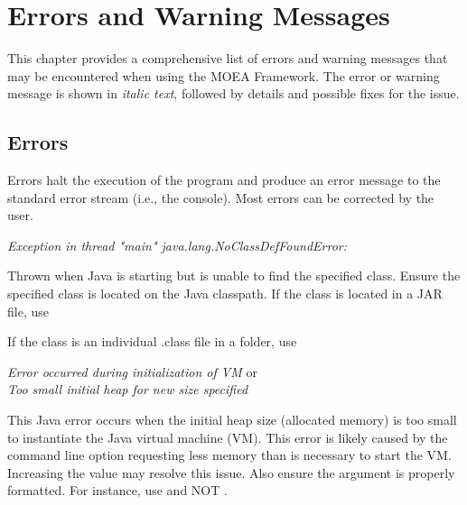 %
%

\chapter{Errors and Warning Messages}

This chapter provides a comprehensive list of errors and warning messages that may be encountered when using the MOEA Framework.  The error or warning message is shown in \textit{italic text}, followed by details and possible fixes for the issue.

\section{Errors}
Errors halt the execution of the program and produce an error message to the standard error stream (i.e., the console).  Most errors can be corrected by the user.
\vspace{\baselineskip}

\noindent
\textit{Exception in thread "main" java.lang.NoClassDefFoundError: }
\begin{indented}
  Thrown when Java is starting but is unable to find the specified class.  Ensure the specified class is located on the Java classpath.  If the class is located in a JAR file, use
  \begin{indented}
  \end{indented}
  If the class is an individual .class file in a folder, use
  \begin{indented}
  \end{indented}
\end{indented}

\noindent
\textit{Error occurred during initialization of VM} or\\
\textit{Too small initial heap for new size specified}
\begin{indented}
  This Java error occurs when the initial heap size (allocated memory) is too small to instantiate the Java virtual machine (VM).  This error is likely caused by the  command line option requesting less memory than is necessary to start the VM.  Increasing the  value may resolve this issue. Also ensure the  argument is properly formatted.  For instance, use  and NOT .
\end{indented}

